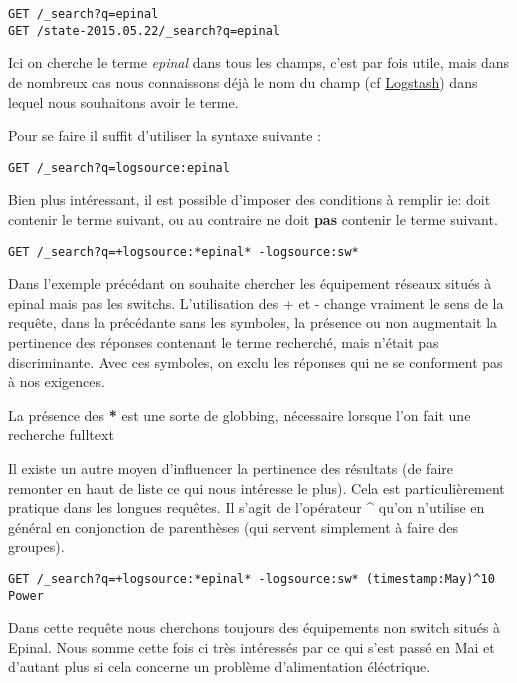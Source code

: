 {\begin{lstlisting}[style=code,label={lst:APIsearchliteexample1},caption={Exemples simples}]
GET /_search?q=epinal
GET /state-2015.05.22/_search?q=epinal
\end{lstlisting}

Ici on cherche le terme \emph{epinal} dans tous les champs, c'est par fois utile,
mais dans de nombreux cas nous connaissons déjà le nom du champ (cf \hyperref[lst:grokregex1]{Logstash}) dans
lequel nous souhaitons avoir le terme. 

Pour se faire il suffit d'utiliser la syntaxe suivante : 
\begin{lstlisting}[style=code,label={lst:APIsearchliteexample2},caption={Choix du champ}]
GET /_search?q=logsource:epinal
\end{lstlisting}

Bien plus intéressant, il est possible d'imposer des conditions à remplir ie: doit
contenir le terme suivant, ou au contraire ne doit \textbf{pas} contenir le terme 
suivant.

\begin{lstlisting}[style=code,label={lst:APIsearchliteexample3},caption={Conditions must (not) match}]
GET /_search?q=+logsource:*epinal* -logsource:sw*
\end{lstlisting}

Dans l'exemple précédant on souhaite chercher les équipement réseaux situés à epinal
mais pas les switchs.
L'utilisation des + et - change vraiment le sens de la requête, dans la précédante
sans les symboles, la présence ou non augmentait la pertinence des réponses contenant
le terme recherché, mais n'était pas discriminante.
Avec ces symboles, on exclu les réponses qui ne se conforment pas à nos exigences.


La présence des \textbf{*} est une sorte de globbing, nécessaire lorsque l'on fait
une recherche fulltext 


Il existe un autre moyen d'influencer la pertinence des résultats (de faire remonter
en haut de liste ce qui nous intéresse le plus).
Cela est particulièrement pratique dans les longues requêtes.
Il s'agit de l'opérateur \textbf{\^} qu'on n'utilise en général en conjonction de
parenthèses (qui servent simplement à faire des groupes).


\begin{lstlisting}[style=code,label={lst:APIsearchliteexample4},caption={Modifier la pertinence}]
GET /_search?q=+logsource:*epinal* -logsource:sw* (timestamp:May)^10 Power
\end{lstlisting}
Dans cette requête nous cherchons toujours des équipements non switch situés à Epinal.
Nous somme cette fois ci très intéressés par ce qui s'est passé en Mai et d'autant
plus si cela concerne un problème d'alimentation éléctrique.

}
